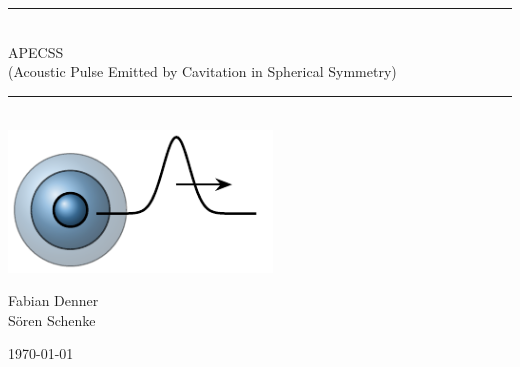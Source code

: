 \documentclass[fleqn,11pt]{report}
\newcommand{\HRule}{\rule{\linewidth}{0.5mm}}
\newcommand{\thedate}{\today}
\begin{document}
\begin{titlepage}
\begin{center}
\null \vfill
\HRule \\[0.4cm]
{\huge APECSS}\\[0.05cm] {\large (Acoustic Pulse Emitted by Cavitation in Spherical Symmetry)}\\[0.1cm]
\HRule \\[2cm]

\includegraphics[width=7cm]{figures/apecssbubble.pdf}

\vspace{5cm}
Fabian Denner\\
S\"oren Schenke
\vfill

\thedate

\end{center}
\end{titlepage}

{\hypersetup{linkcolor=black}
\tableofcontents 
}






\cleardoublepage



\end{document}
